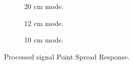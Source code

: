 \begin{figure}[ht!]
\begin{subfigure}{0.5\textwidth}
\begin{center}
 \caption{20 cm mode.}
 \label{fg:20cmPSF}
 \end{center}
\end{subfigure}
\begin{subfigure}{0.5\textwidth}
\begin{center}
 \caption{12 cm mode.}
 \label{fg:12cmPSF}
 \end{center}
\end{subfigure}
\begin{subfigure}{0.5\textwidth}
\begin{center}
 \caption{10 cm mode.}
 \label{fg:10cmPSF}
 \end{center}
\end{subfigure}
\caption{Processed signal Point Spread Response.}
\label{fg:PSFAll}
\end{figure}
\clearpage
